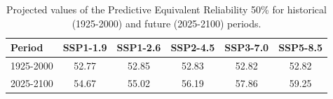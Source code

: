 \begin{table}[htbp]
\centering
\begin{tabular}{lccccc}
\toprule
Period & \textbf{SSP1-1.9} & \textbf{SSP1-2.6} & \textbf{SSP2-4.5} & \textbf{SSP3-7.0} & \textbf{SSP5-8.5} \\
\midrule
1925-2000 & 52.77 & 52.85 & 52.83 & 52.82 & 52.82 \\
2025-2100 & 54.67 & 55.02 & 56.19 & 57.86 & 59.25 \\
\bottomrule
\end{tabular}
\caption{Projected values of the Predictive Equivalent Reliability 50\% for historical (1925-2000) and future (2025-2100) periods.}
\label{tab:pred_scenarios_2per}
\end{table}